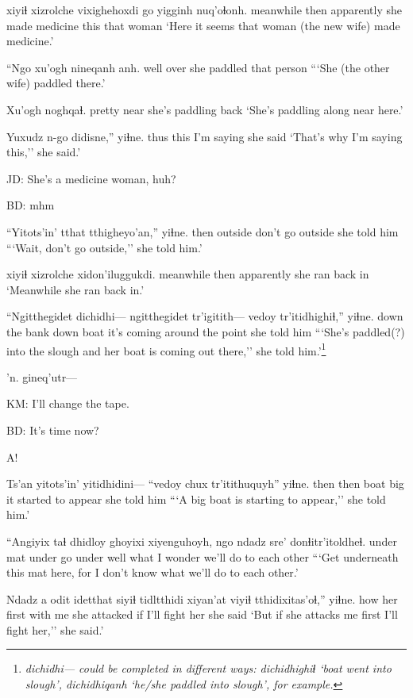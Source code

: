 \documentclass[12pt]{article}
\begin{document}
 xiyiɬ xizrolche vixighehoxdi go yigginh nuq'oɬonh. 
{meanwhile} then apparently {she made medicine} this that woman 
\glt `Here it seems that woman (the new wife) made medicine.'
\glend

\gll ``Ngo xu'ogh nineqanh anh.  
well over {she paddled} {that person}
\glt ```She (the other wife) paddled there.' 
\glend

\gll Xu'ogh noghqaɬ. 
{pretty near}  {she's paddling back}
\glt `She's paddling along near here.' 
\glend

\gll Yuxudz n-go didisne,'' yiɬne. 
thus  this  {I'm saying} {she said}
\glt `That's why I'm saying this,'' she said.' 
\glend

JD:  She's a medicine woman, huh?

BD:  mhm

\gll ``Yitots'in' tthat tthigheyo'an,'' yiɬne. 
then       outside {don't go outside} {she told him}      
\glt ```Wait, don't go outside,'' she told him.' 
\glend

 xiyiɬ xizrolche {xidon'iluggukdi.} 
{meanwhile} then apparently {she ran back in}
\glt `Meanwhile she ran back in.' 
\glend

\gll ``Ngitthegidet dichidhi--- ngitthegidet tr'igitith--- vedoy tr'itidhighiɬ,'' yiɬne. 
{down the bank} {} down {} boat {it's coming around the point} {she told him}
\glt ```She's paddled(?) into the slough and her boat is coming out there,'' she told him.'\footnote{\em dichidhi--- \em could be completed in different ways: \em dichidhighiɬ \em `boat went into slough', \em dichidhiqanh \em `he/she paddled into slough', for example.} 
\glend

'n. gineq'utr---

KM:  I'll change the tape.

BD:  It's time now? 

A!

\gll Ts'an yitots'in' yitidhidini--- ``vedoy chux tr'itithuquyh'' yiɬne.
then then {} boat big {it started to appear} {she told him} 
\glt ```A big boat is starting to appear,'' she told him.' 
\glend

\gll ``Angiyix {taɬ dhidloy} ghoyixi xiyenguhoyh, ngo ndadz sre' donɬitr'itoldheɬ. 
under   mat  under {go under} well what {I wonder} {we'll do to each other} {}
\glt ```Get underneath this mat here, for I don't know what we'll do to each other.' 
\glend

\gll Ndadz a odit idetthat siyiɬ tidltthidi xiyan'at {viyiɬ tthidixitas'oɬ},'' yiɬne.
how {} her first {with me} {she attacked} if {I'll fight her} {she said}
\glt `But if she attacks me first I'll fight her,'' she said.'
\glend
\end{document}
